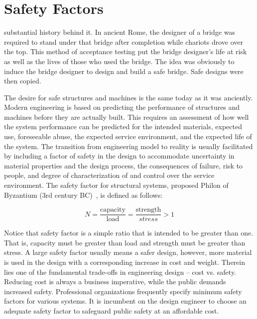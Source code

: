 \section{Safety Factors}\label{appendix-safety}

 substantial history behind it. In ancient Rome, the designer of a bridge was required to stand under that bridge after completion while chariots drove over the top. This method of acceptance testing put the bridge designer's life at risk as well as the lives of those who used the bridge. The idea was obviously to induce the bridge designer to design and build a safe bridge. Safe designs were then copied.

The desire for safe structures and machines is the same today as it was anciently. Modern engineering is based on predicting the performance of structures and machines before they are actually built. This requires an assessment of how well the system performance can be predicted for the intended materials, expected use, foreseeable abuse, the expected service environment, and the expected life of the system. The transition from engineering model to reality is usually facilitated by including a factor of safety in the design to accommodate uncertainty in material properties and the design process, the consequences of failure, risk to people, and degree of characterization of and control over the service environment. The safety factor for structural systems, proposed Philon of Byzantium (3rd century BC)~\cite{joseph2001}, is defined as follows:

\begin{equation}
  N = \frac{\text{capacity}}{\text{load}} = \frac{\text{strength}}{stress} > 1
  \label{equ-safety-1}
\end{equation}

Notice that safety factor is a simple ratio that is intended to be greater than one. That is, capacity must be greater than load and strength must be greater than stress. A large safety factor usually means a safer design, however, more material is used in the design with a corresponding increase in cost and weight. Therein lies one of the fundamental trade-offs in engineering design – cost vs. safety. Reducing cost is always a business imperative, while the public demands increased safety. Professional organizations frequently specify minimum safety factors for various systems. It is incumbent on the design engineer to choose an adequate safety factor to safeguard public safety at an affordable cost.

